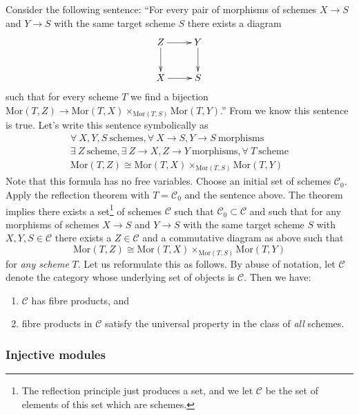 \documentclass{amsart}
\theoremstyle{definition}
\theoremstyle{remark}
\numberwithin{equation}{subsection}
\begin{document}
\noindent
Consider the following sentence: ``For every pair of morphisms of
schemes $X \to S$ and $Y\to S$ with the same target scheme $S$
there exists a diagram
$$
\xymatrix{
Z \ar[r] \ar[d] & Y \ar[d] \cr
X \ar[r] & S \cr
}
$$
such that for every scheme $T$ we 
find a bijection $\text{Mor}(T, Z) \to \text{Mor}(T,X)
\times_{\text{Mor}(T,S)} \text{Mor}(T, Y)$.''
From \cite{H} we know this sentence is true.
Let's write this sentence symbolically as
\begin{eqnarray*}
\forall\ X,Y,S\ \text{schemes},
\forall\ X\to S, Y\to S\ \text{morphisms} \\
\exists\ Z\ \text{scheme},
\exists\ Z \to X, Z\to Y\ \text{morphisms},
\forall\ T\ \text{scheme} \\
\text{Mor}(T, Z) \cong \text{Mor}(T,X)
\times_{\text{Mor}(T,S)} \text{Mor}(T, Y)
\end{eqnarray*}
Note that this formula has no free variables.
Choose an initial set of schemes $\mathcal{C}_0$.
Apply the reflection theorem with $T=\mathcal{C}_0$
and the sentence above. The theorem implies
there exists a set\footnote{The
reflection principle just produces a set, and we
let $\mathcal{C}$ be the set of elements of this set which are schemes.}
of schemes
$\mathcal{C}$ such that
$\mathcal{C}_0 \subset \mathcal{C}$ and such that
for any morphisms of schemes $X \to S$ and $Y\to S$
with the same target scheme $S$ with $X,Y,S \in \mathcal{C}$
there exists a $Z \in \mathcal{C}$ and a commutative
diagram as above such that
$$
\text{Mor}(T, Z) \cong \text{Mor}(T,X)
\times_{\text{Mor}(T,S)} \text{Mor}(T, Y)
$$
for {\it any scheme} $T$. Let us reformulate this as follows.
By abuse of notation, let $\mathcal{C}$ denote the category
whose underlying set of objects is $\mathcal{C}$.
Then we have:
\begin{enumerate}
\item $\mathcal{C}$ has fibre products, and
\item fibre products in $\mathcal{C}$ satisfy
the universal property in the class of {\it all} schemes.
\end{enumerate}

\subsubsection{Injective modules}
\end{document}
